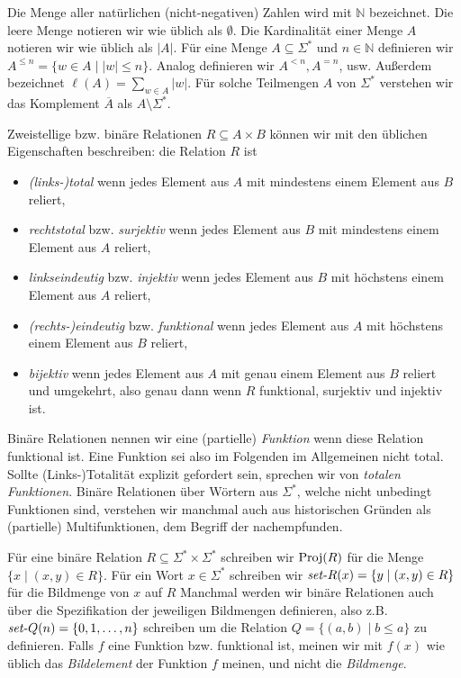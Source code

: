 Die Menge aller natürlichen (nicht-negativen) Zahlen wird mit $\mathbb N$ bezeichnet. Die leere Menge notieren wir wie üblich als $\emptyset$. Die Kardinalität einer Menge $A$ notieren wir wie üblich als $|A|$. Für eine Menge $A\subseteq\Sigma^*$ und $n\in \mathbb N$ definieren wir $A^{\leq n} = \{ w\in A \mid |w|\leq n\}$. Analog definieren wir $A^{<n}, A^{=n}$, usw. Außerdem bezeichnet $\ell(A)=\sum_{w\in A} |w|$. Für solche Teilmengen $A$ von $\Sigma^*$ verstehen wir das Komplement $\overline{A}$ als $A\setminus \Sigma^*$.

Zweistellige bzw. binäre Relationen $R\subseteq A\times B$ können wir mit den üblichen Eigenschaften beschreiben: die Relation $R$ ist
\begin{itemize}
    \item \emph{(links-)total} wenn jedes Element aus $A$ mit mindestens einem Element aus $B$ reliert,
    \item \emph{rechtstotal} bzw. \emph{surjektiv} wenn jedes Element aus $B$ mit mindestens einem Element aus $A$ reliert,
    \item \emph{linkseindeutig} bzw. \emph{injektiv} wenn jedes Element aus $B$ mit höchstens einem Element aus $A$ reliert,
    \item \emph{(rechts-)eindeutig} bzw. \emph{funktional} wenn jedes Element aus $A$ mit höchstens einem Element aus $B$ reliert,
    \item \emph{bijektiv} wenn jedes Element aus $A$ mit genau einem Element aus $B$ reliert und umgekehrt, also genau dann wenn $R$ funktional, surjektiv und injektiv ist.
\end{itemize}
Binäre Relationen nennen wir eine (partielle) \emph{Funktion} wenn diese Relation funktional ist. Eine Funktion sei also im Folgenden im Allgemeinen nicht total. Sollte (Links-)Totalität explizit gefordert sein, sprechen wir von \emph{totalen Funktionen}.
Binäre Relationen über Wörtern aus $\Sigma^*$, welche nicht unbedingt Funktionen sind, verstehen wir manchmal auch aus historischen Gründen als (partielle) Multifunktionen, dem Begriff der  nachempfunden.

Für eine binäre Relation $R\subseteq\Sigma^* \times \Sigma^*$ schreiben wir $\operatorname{Proj}(R)$ für die Menge $\{ x\mid (x,y)\in R \}$. 
Für ein Wort $x\in\Sigma^*$ schreiben wir $\mathit{set}\text{-}{}R(x)=\{ y\mid (x,y)\in R \}$ für die Bildmenge von $x$ auf $R$
Manchmal werden wir binäre Relationen auch über die Spezifikation der jeweiligen Bildmengen definieren, also z.B. $\mathit{set}\text{-}{}Q(n) = \{ 0, 1, \dots, n\}$ schreiben um die Relation $Q=\{ (a,b)\mid b\leq a \}$ zu definieren.
Falls $f$ eine Funktion bzw. funktional ist, meinen wir mit $f(x)$ wie üblich das \emph{Bildelement} der Funktion $f$ meinen, und nicht die \emph{Bildmenge}. 



